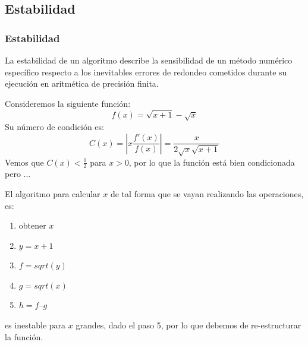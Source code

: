 \subsection{Estabilidad}
\begin{frame}
\frametitle{Estabilidad}
La estabilidad de un algoritmo describe la sensibilidad de un método numérico específico
respecto a los inevitables errores de redondeo cometidos durante su ejecución en aritmética de precisión finita.
\end{frame}
\begin{frame}
Consideremos la siguiente función:
\[ f(x) = \sqrt{x+1} - \sqrt{x} \]
Su número de condición es:
\[ C(x) = \left | x \dfrac{f'(x)}{f(x)} \right | = \dfrac{x}{2 \sqrt{x} \sqrt{x+1}}\]
Vemos que $C(x)< \frac{1}{2}$ para $x>0$, por lo que la función está bien condicionada pero ...
\end{frame}
\begin{frame}
El algoritmo para calcular $x$ de tal forma que se vayan realizando las operaciones, es:
\begin{enumerate}[<+->]
\item obtener $x$
\item $y = x + 1$
\item $f = sqrt(y)$
\item $g = sqrt(x)$
\item $h = f – g$
\end{enumerate}
\pause
es inestable para $x$ grandes, dado el paso 5, por lo que debemos de re-estructurar la función.
\end{frame}
